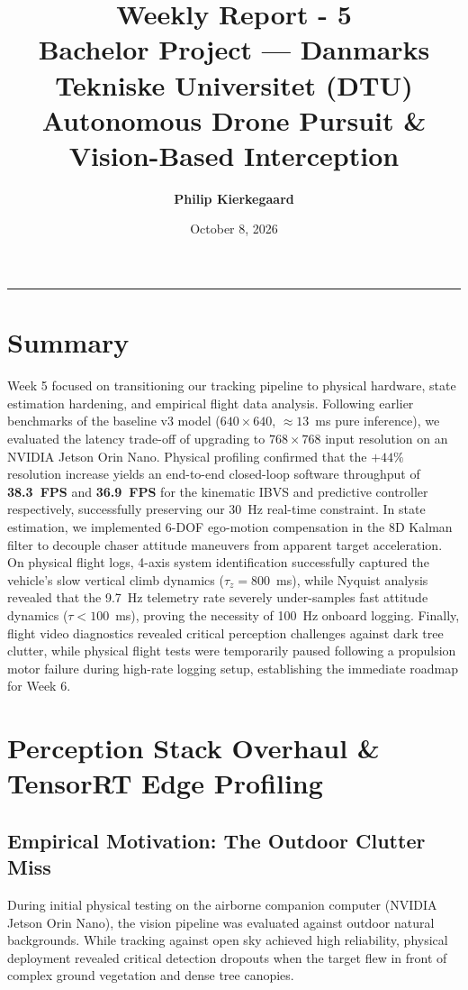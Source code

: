 \documentclass[11pt,a4paper]{article}
\title{\textbf{Weekly Report - 5}\\[0.2em]
\large Bachelor Project --- Danmarks Tekniske Universitet (DTU)\\[0.1em]
\normalsize Autonomous Drone Pursuit \& Vision-Based Interception}
\author{\textbf{Philip Kierkegaard}}
\date{October 8, 2026}
\begin{document}
\maketitle

\vspace{-1.5em}
\noindent\rule{\textwidth}{0.4pt}

\section*{Summary}
Week 5 focused on transitioning our tracking pipeline to physical hardware, state estimation hardening, and empirical flight data analysis. Following earlier benchmarks of the baseline v3 model ($640\times 640$, $\approx 13$~ms pure inference), we evaluated the latency trade-off of upgrading to $768\times 768$ input resolution on an NVIDIA Jetson Orin Nano. Physical profiling confirmed that the $+44\%$ resolution increase yields an end-to-end closed-loop software throughput of \textbf{38.3~FPS} and \textbf{36.9~FPS} for the kinematic IBVS and predictive controller respectively, successfully preserving our 30~Hz real-time constraint. In state estimation, we implemented 6-DOF ego-motion compensation in the 8D Kalman filter to decouple chaser attitude maneuvers from apparent target acceleration.
On physical flight logs, 4-axis system identification successfully captured the vehicle's slow vertical climb dynamics ($\tau_z = 800$~ms), while Nyquist analysis revealed that the 9.7~Hz telemetry rate severely under-samples fast attitude dynamics ($\tau < 100$~ms), proving the necessity of 100~Hz onboard logging. Finally, flight video diagnostics revealed critical perception challenges against dark tree clutter, while physical flight tests were temporarily paused following a propulsion motor failure during high-rate logging setup, establishing the immediate roadmap for Week 6.

\section{Perception Stack Overhaul \& TensorRT Edge Profiling}

\subsection{Empirical Motivation: The Outdoor Clutter Miss}
During initial physical testing on the airborne companion computer (NVIDIA Jetson Orin Nano), the vision pipeline was evaluated against outdoor natural backgrounds. While tracking against open sky achieved high reliability, physical deployment revealed critical detection dropouts when the target flew in front of complex ground vegetation and dense tree canopies.
\end{document}
